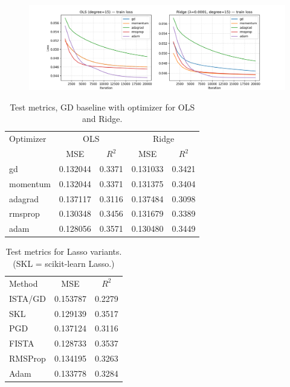\documentclass[amssymb,twocolumn,aps]{revtex4-2}
\begin{document}
\begin{figure}[H]
    \centering
    \includegraphics[width=1\linewidth]{Project-1/Figures/Part_c_d_e_f_GD_optimizers_loss_curves.png}
    \caption{}
    \label{fig:}
\end{figure}

\begin{table}[h!]
\caption{Test metrics, GD baseline with optimizer for OLS and Ridge.}
\label{tab:test-metrics-optimizers}
\begin{ruledtabular}
\begin{tabular}{lcccc}
Optimizer & \multicolumn{2}{c}{OLS} & \multicolumn{2}{c}{Ridge} \\
\colrule
 & MSE & $R^2$ & MSE & $R^2$ \\
\colrule
gd       & 0.132044 & 0.3371 & 0.131033 & 0.3421 \\
momentum & 0.132044 & 0.3371 & 0.131375 & 0.3404 \\
adagrad  & 0.137117 & 0.3116 & 0.137484 & 0.3098 \\
rmsprop  & 0.130348 & 0.3456 & 0.131679 & 0.3389 \\
adam     & 0.128056 & 0.3571 & 0.130480 & 0.3449 \\
\end{tabular}
\end{ruledtabular}
\end{table}

\begin{table}[h!]
\caption{Test metrics for Lasso variants. (SKL = scikit-learn Lasso.)}
\label{tab:lasso-variants}
\begin{ruledtabular}
\begin{tabular}{lcc}
Method & MSE & $R^2$ \\
\colrule
ISTA/GD    & 0.153787 & 0.2279 \\
SKL     & 0.129139 & 0.3517 \\
PGD     & 0.137124 & 0.3116 \\
FISTA   & 0.128733 & 0.3537 \\
RMSProp & 0.134195 & 0.3263 \\
Adam    & 0.133778 & 0.3284 \\
\end{tabular}
\end{ruledtabular}
\end{table}
\end{document}
